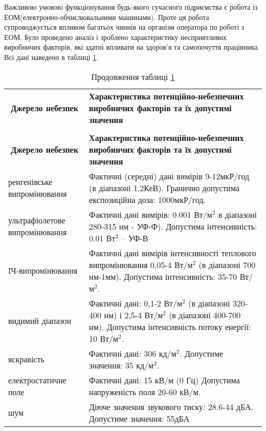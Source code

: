 \par Важливою умовою функціонування будь-якого сучасного підриємства є робота із ЕОМ(електронно-обчислювальними машинами). Проте ця робота супроводжується впливом багатьох чиннів на організм оператора по роботі з ЕОМ. Було проведено аналіз і зроблено характеристику несприятливих виробничих факторів, які здатні впливати на здоров'я та самопочуття працівника. Всі дані наведено в таблиці \ref{t:safety1}.

{\footnotesize
\begin{longtable}{|p{4cm}|p{12cm}|}
\captionsetup{justification=centering}
\caption{Аналіз потенційних небезпек виробничих факторів при роботі з ЕОМ}\label{t:safety1}\\
\hline
\multicolumn{1}{|c|}{\textbf{Джерело небезпек}}&
\multicolumn{1}{p{12cm}|}{\textbf{Характеристика потенційно-небезпечних виробничих факторів та їх допустимі значення}}\\\hline

\endfirsthead
\caption*{\hfill Продовження таблиці \ref{t:safety1}}\\\hline

\multicolumn{1}{|c|}{\textbf{Джерело небезпек}}&
\multicolumn{1}{p{12cm}|}{\textbf{Характеристика потенційно-небезпечних виробничих факторів та їх допустимі значення}}\\\hline
\endhead

ренгенівське випромінювання	& Фактичні (середні) дані вимірів 9-12мкР/год (в діапазоні 1.2КеВ). Гранично допустима експозиційна доза: 1000мкР/год.  	\\ \hline


ультрафіолетове випромінювання & Фактичні дані вимірів: 0.001 Вт/м$^2$ в діапазоні 280-315 нм - УФ-Ф). Допустима інтенсивність: 0.01 Вт$^2$ -- УФ-В\\ \hline


ІЧ-випромінювання 	& 	Фактичні дані вимірів інтенсивності теплового випромінювання 0,05-4 Вт/м$^2$ (в діапазоні 700 нм-1мм). Допустима інтенсивність:  35-70 Вт/м$^2$.	\\ \hline

видимий діапазон  	& 	Фактичні дані: 0,1-2 Вт/м$^2$ (в діапазоні 320-400 нм) і 2,5-4 Вт/м$^2$ (в діапазоні 400-700 нм). Допустима інтенсивність потоку енергії:  10 Вт/м$^2$.	\\ \hline


яскравість 	& 	Фактичні дані: 306 кд/м$^2$. Допустиме значення: 35 кд/м$^2$.	\\ \hline

електростатичне поле & Фактичні дані: 15 кВ/м (0 Гц) Допустима напруженість поля  20-60 кВ/м.\\ \hline

шум 	& 	Діюче значення звукового тиску: 28.6-44 дБА. Допустиме значення: 55дБА
	\\ \hline

\end{longtable}
}


